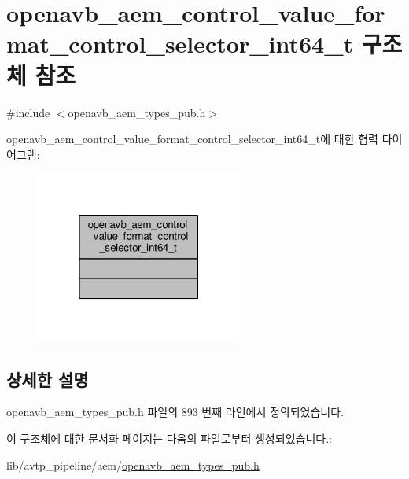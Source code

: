 \hypertarget{structopenavb__aem__control__value__format__control__selector__int64__t}{}\section{openavb\+\_\+aem\+\_\+control\+\_\+value\+\_\+format\+\_\+control\+\_\+selector\+\_\+int64\+\_\+t 구조체 참조}
\label{structopenavb__aem__control__value__format__control__selector__int64__t}


{\ttfamily \#include $<$openavb\+\_\+aem\+\_\+types\+\_\+pub.\+h$>$}



openavb\+\_\+aem\+\_\+control\+\_\+value\+\_\+format\+\_\+control\+\_\+selector\+\_\+int64\+\_\+t에 대한 협력 다이어그램\+:
\nopagebreak
\begin{figure}[H]
\begin{center}
\leavevmode
\includegraphics[width=193pt]{structopenavb__aem__control__value__format__control__selector__int64__t__coll__graph}
\end{center}
\end{figure}


\subsection{상세한 설명}


openavb\+\_\+aem\+\_\+types\+\_\+pub.\+h 파일의 893 번째 라인에서 정의되었습니다.



이 구조체에 대한 문서화 페이지는 다음의 파일로부터 생성되었습니다.\+:\begin{DoxyCompactItemize}
\item 
lib/avtp\+\_\+pipeline/aem/\hyperlink{openavb__aem__types__pub_8h}{openavb\+\_\+aem\+\_\+types\+\_\+pub.\+h}\end{DoxyCompactItemize}

